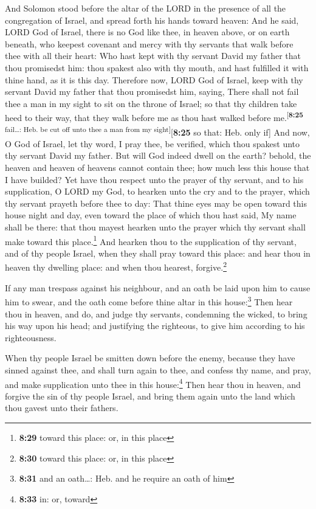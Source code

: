  And Solomon stood before the altar of the LORD in the
presence of all the congregation of Israel, and spread forth his hands
toward heaven:  And he said, LORD God of Israel, there is
no God like thee, in heaven above, or on earth beneath, who keepest
covenant and mercy with thy servants that walk before thee with all
their heart:  Who hast kept with thy servant David my
father that thou promisedst him: thou spakest also with thy mouth, and
hast fulfilled it with thine hand, as it is this day. 
Therefore now, LORD God of Israel, keep with thy servant David my father
that thou promisedst him, saying, There shall not fail thee a man in my
sight to sit on the throne of Israel; so that thy children take heed to
their way, that they walk before me as thou hast walked before
me.\textsuperscript{{[}\textbf{8:25} fail\ldots: Heb. be cut off unto
thee a man from my sight{]}}{[}\textbf{8:25} so that: Heb. only if{]}
 And now, O God of Israel, let thy word, I pray thee, be
verified, which thou spakest unto thy servant David my father.
 But will God indeed dwell on the earth? behold, the
heaven and heaven of heavens cannot contain thee; how much less this
house that I have builded?  Yet have thou respect unto
the prayer of thy servant, and to his supplication, O LORD my God, to
hearken unto the cry and to the prayer, which thy servant prayeth before
thee to day:  That thine eyes may be open toward this
house night and day, even toward the place of which thou hast said, My
name shall be there: that thou mayest hearken unto the prayer which thy
servant shall make toward this place.\footnote{\textbf{8:29} toward this
  place: or, in this place}  And hearken thou to the
supplication of thy servant, and of thy people Israel, when they shall
pray toward this place: and hear thou in heaven thy dwelling place: and
when thou hearest, forgive.\footnote{\textbf{8:30} toward this place:
  or, in this place}

 If any man trespass against his neighbour, and an oath
be laid upon him to cause him to swear, and the oath come before thine
altar in this house:\footnote{\textbf{8:31} and an oath\ldots: Heb. and
  he require an oath of him}  Then hear thou in heaven,
and do, and judge thy servants, condemning the wicked, to bring his way
upon his head; and justifying the righteous, to give him according to
his righteousness.

 When thy people Israel be smitten down before the enemy,
because they have sinned against thee, and shall turn again to thee, and
confess thy name, and pray, and make supplication unto thee in this
house:\footnote{\textbf{8:33} in: or, toward}  Then hear
thou in heaven, and forgive the sin of thy people Israel, and bring them
again unto the land which thou gavest unto their fathers.

